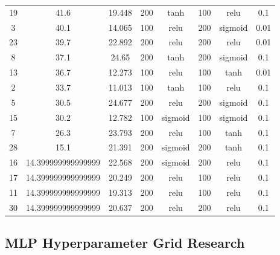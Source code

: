 \begin{table}[h]
\begin{tabular}{@{}cccccccc@{}}
19 & 41.6               & 19.448      & 200     & tanh         & 100     & relu         & 0.1           \\
3  & 40.1               & 14.065      & 100     & relu         & 200     & sigmoid      & 0.01          \\
23 & 39.7               & 22.892      & 200     & relu         & 200     & relu         & 0.01          \\
8  & 37.1               & 24.65       & 200     & tanh         & 200     & sigmoid      & 0.1           \\
13 & 36.7               & 12.273      & 100     & relu         & 100     & tanh         & 0.01          \\
2  & 33.7               & 11.013      & 100     & tanh         & 100     & relu         & 0.1           \\
5  & 30.5               & 24.677      & 200     & relu         & 200     & sigmoid      & 0.1           \\
15 & 30.2               & 12.782      & 100     & sigmoid      & 100     & sigmoid      & 0.1           \\
7  & 26.3               & 23.793      & 200     & relu         & 100     & tanh         & 0.1           \\
28 & 15.1               & 21.391      & 200     & sigmoid      & 200     & tanh         & 0.1           \\
16 & 14.399999999999999 & 22.568      & 200     & sigmoid      & 200     & relu         & 0.1           \\
17 & 14.399999999999999 & 20.249      & 200     & relu         & 100     & relu         & 0.1           \\
11 & 14.399999999999999 & 19.313      & 200     & relu         & 100     & relu         & 0.1           \\
30 & 14.399999999999999 & 20.637      & 200     & relu         & 200     & relu         & 0.1           \\ \bottomrule
\end{tabular}
\end{table}

\newpage

\subsection*{MLP Hyperparameter Grid Research}

